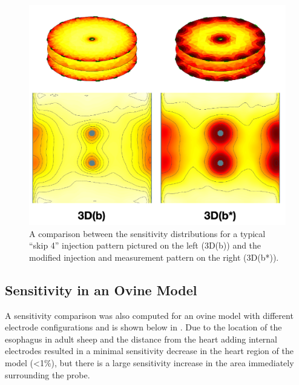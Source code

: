 \begin{figure}[H]
\centering
\includegraphics[width=\textwidth]{chapter6-internal_electrodes/imgs/Injection_Comparison.pdf}
\caption[Sensitivity using internal electrodes with modified injection patterns]{A comparison between the sensitivity distributions for a typical ``skip 4'' injection pattern pictured on the left (3D(b)) and 
the modified injection and measurement pattern on the right (3D(b*)).}
\label{fig:modified_measurement_sens}
\end{figure}

\subsection{Sensitivity in an Ovine Model}

A sensitivity comparison was also computed for an ovine model with different 
electrode configurations 
and is shown below in 
. Due to the location of the esophagus in adult sheep
and the distance from the heart
adding internal electrodes resulted 
in a minimal sensitivity decrease in the 
heart region of the model (<1\%), but there is 
a large sensitivity increase in the area immediately surrounding the 
probe.

